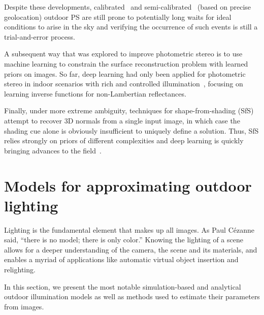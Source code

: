 Despite these developments, calibrated~\cite{yu-iccp-13} and semi-calibrated~\cite{jung-cvpr-15} (based on precise geolocation) outdoor PS are still prone to potentially long waits for ideal conditions to arise in the sky and verifying the occurrence of such events is still a trial-and-error process.

A subsequent way that was explored to improve photometric stereo is to use machine learning to constrain the surface reconstruction problem with learned priors on images. So far, deep learning had only been applied for photometric stereo in indoor scenarios with rich and controlled illumination~\cite{yu-iccv-17,santo-iccv-17,taniai-arxiv-18,shi-tpami-18}, focusing on learning inverse functions for non-Lambertian reflectances.



Finally, under more extreme ambiguity, techniques for shape-from-shading (SfS)~\cite{Horn1989,Zhang1999,Langer1994,oxholm-eccv-12,johnson-cvpr-11,barron-pami-15} attempt to recover 3D normals from a single input image, in which case the shading cue alone is obviously insufficient to uniquely define a solution. Thus, SfS relies strongly on priors of different complexities and deep learning is quickly bringing advances to the field~\cite{eigen-iccv-15,shu-cvpr-17,wu-nips-17,shu-cvpr-17}.


\section{Models for approximating outdoor lighting}
\label{rw:skymodels}

Lighting is the fundamental element that makes up all images. As Paul Cézanne said, ``there is no model; there is only color.'' Knowing the lighting of a scene allows for a deeper understanding of the camera, the scene and its materials, and enables a myriad of applications like automatic virtual object insertion and relighting.

In this section, we present the most notable simulation-based and analytical outdoor illumination models as well as methods used to estimate their parameters from images.

